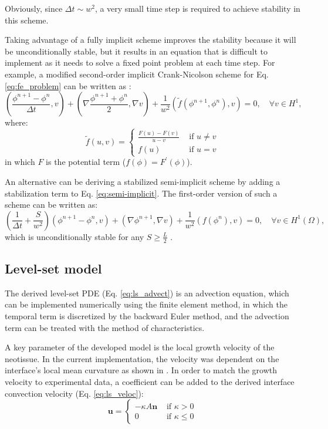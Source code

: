 Obviously, since $\Delta t \sim w^2$, a very small time step is required to achieve stability in this scheme. 

Taking advantage of a fully implicit scheme improves the stability because it will be unconditionally stable, but it results in an equation that is difficult to implement as it needs to solve a fixed point problem at each time step. For example, a modified second-order implicit Crank-Nicolson scheme for Eq. \ref{eq:fe_problem} can be written as \cite{Abboud2019,Elliott1989}:
\begin{equation}
\left(\frac{\phi^{n+1}-\phi^{n}}{\Delta t}, v\right)+\left(\nabla \frac{\phi^{n+1}+\phi^{n}}{2}, \nabla v\right)+\frac{1}{w^{2}}\left(\tilde{f}\left(\phi^{n+1}, \phi^{n}\right), v\right)=0, \quad \forall v \in H^{1},
\end{equation}
where:
\begin{equation}
\tilde{f}(u, v)=\left\{\begin{array}{ll}
\frac{F(u)-F(v)}{u-v} & \text { if } u \neq v \\
f(u) & \text { if } u=v
\end{array}\right.
\end{equation}
in which $F$ is the potential term ($f(\phi)=F^{\prime}(\phi)$).

An alternative can be deriving a stabilized semi-implicit scheme by adding a stabilization term to Eq. \ref{eq:semi-implicit}. The first-order version of such a scheme can be written as:
\begin{equation}
\left(\frac{1}{\Delta t}+\frac{S}{w^{2}}\right)\left(\phi^{n+1}-\phi^{n}, v\right)+\left(\nabla \phi^{n+1}, \nabla v\right)+\frac{1}{w^{2}}\left(f\left(\phi^{n}\right), v\right)=0, \quad \forall v \in H^{1}(\Omega),
\end{equation}
which is unconditionally stable for any $S \geq \frac{L}{2}$ \cite{Shen2010}.


\subsection{Level-set model}

The derived level-set PDE (Eq. \ref{eq:ls_advect}) is an advection equation, which can be implemented numerically using the finite element method, in which the temporal term is discretized by the backward Euler method, and the advection term can be treated with the method of characteristics. 

A key parameter of the developed model is the local growth velocity of the neotissue. In the current implementation, the velocity was dependent on the interface's local mean curvature as shown in \cite{Bidan2012a,Guyot2014}. In order to match the growth velocity to experimental data, a coefficient can be added to the derived interface convection velocity (Eq. \ref{eq:ls_veloc}):
\begin{equation} \label{eq:ls_veloc2}
\boldsymbol{u}=\left\{\begin{array}{ll}
-\kappa A \boldsymbol{n} & \text { if } \kappa>0 \\
0 & \text { if } \kappa \leq 0
\end{array}\right.
\end{equation}

